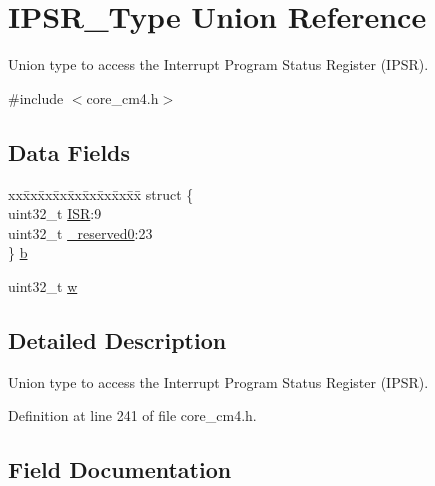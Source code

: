 \hypertarget{union_i_p_s_r___type}{}\section{I\+P\+S\+R\+\_\+\+Type Union Reference}
\label{union_i_p_s_r___type}


Union type to access the Interrupt Program Status Register (I\+P\+SR).  




{\ttfamily \#include $<$core\+\_\+cm4.\+h$>$}

\subsection*{Data Fields}
\begin{DoxyCompactItemize}
\item 
\begin{tabbing}
xx\=xx\=xx\=xx\=xx\=xx\=xx\=xx\=xx\=\kill
struct \{\\
\>uint32\_t \hyperlink{union_i_p_s_r___type_ad502ba7dbb2aab5f87c782b28f02622d}{ISR}:9\\
\>uint32\_t \hyperlink{union_i_p_s_r___type_ac8a6a13838a897c8d0b8bc991bbaf7c1}{\_reserved0}:23\\
\} \hyperlink{union_i_p_s_r___type_a3758147356a15906221a5625a27d9048}{b}\\

\end{tabbing}\item 
uint32\+\_\+t \hyperlink{union_i_p_s_r___type_ad0fb62e7a08e70fc5e0a76b67809f84b}{w}
\end{DoxyCompactItemize}


\subsection{Detailed Description}
Union type to access the Interrupt Program Status Register (I\+P\+SR). 

Definition at line 241 of file core\+\_\+cm4.\+h.



\subsection{Field Documentation}
\mbox{\label{union_i_p_s_r___type_ac8a6a13838a897c8d0b8bc991bbaf7c1}} 
